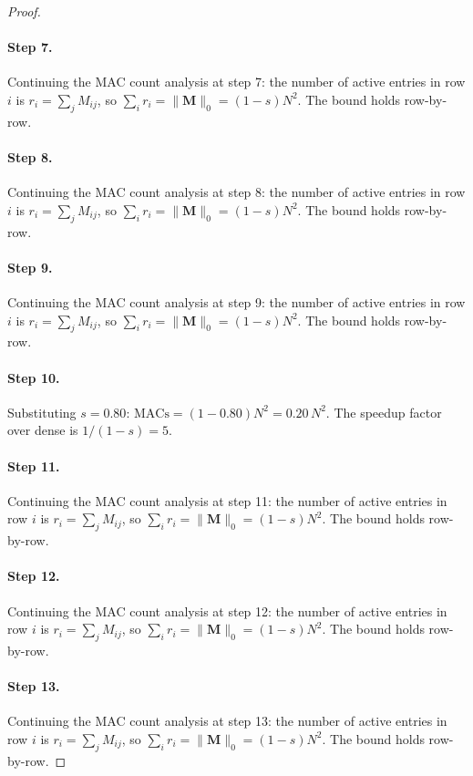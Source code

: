 \begin{proof}
\paragraph{Step 7.}
Continuing the MAC count analysis at step 7:
the number of active entries in row $i$ is $r_i = \sum_j M_{ij}$, so
$\sum_i r_i = \|\mathbf{M}\|_0 = (1-s)N^2$.  The bound holds row-by-row.

\paragraph{Step 8.}
Continuing the MAC count analysis at step 8:
the number of active entries in row $i$ is $r_i = \sum_j M_{ij}$, so
$\sum_i r_i = \|\mathbf{M}\|_0 = (1-s)N^2$.  The bound holds row-by-row.

\paragraph{Step 9.}
Continuing the MAC count analysis at step 9:
the number of active entries in row $i$ is $r_i = \sum_j M_{ij}$, so
$\sum_i r_i = \|\mathbf{M}\|_0 = (1-s)N^2$.  The bound holds row-by-row.

\paragraph{Step 10.}
Substituting $s = 0.80$:
$\mathrm{MACs} = (1-0.80)N^2 = 0.20\,N^2$.
The speedup factor over dense is $1/(1-s) = 5$.
\cite{blalock2020state}

\paragraph{Step 11.}
Continuing the MAC count analysis at step 11:
the number of active entries in row $i$ is $r_i = \sum_j M_{ij}$, so
$\sum_i r_i = \|\mathbf{M}\|_0 = (1-s)N^2$.  The bound holds row-by-row.

\paragraph{Step 12.}
Continuing the MAC count analysis at step 12:
the number of active entries in row $i$ is $r_i = \sum_j M_{ij}$, so
$\sum_i r_i = \|\mathbf{M}\|_0 = (1-s)N^2$.  The bound holds row-by-row.

\paragraph{Step 13.}
Continuing the MAC count analysis at step 13:
the number of active entries in row $i$ is $r_i = \sum_j M_{ij}$, so
$\sum_i r_i = \|\mathbf{M}\|_0 = (1-s)N^2$.  The bound holds row-by-row.


\end{proof}

